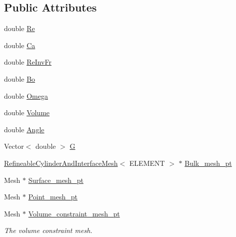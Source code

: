 \subsection*{Public Attributes}
\begin{DoxyCompactItemize}
\item 
double \hyperlink{classRefineableRotatingCylinderProblem_a3a7fe3dd801eb1ef71dcf8e4c6a237ef}{Re}
\item 
double \hyperlink{classRefineableRotatingCylinderProblem_a2e47341fa1a71da29907ead94aeb5ec2}{Ca}
\item 
double \hyperlink{classRefineableRotatingCylinderProblem_acf70c93c4b4db46c1809f6b9f68214ee}{Re\+Inv\+Fr}
\item 
double \hyperlink{classRefineableRotatingCylinderProblem_a253a0d7954a3527bf1410f01080e5c70}{Bo}
\item 
double \hyperlink{classRefineableRotatingCylinderProblem_aaf1d39e57b4fc4d470b69f01121d93a3}{Omega}
\item 
double \hyperlink{classRefineableRotatingCylinderProblem_aa476013effb3f9a45cf1e1e2198aad14}{Volume}
\item 
double \hyperlink{classRefineableRotatingCylinderProblem_a54c8bf3a55597f50087c82ed5f955f5b}{Angle}
\item 
Vector$<$ double $>$ \hyperlink{classRefineableRotatingCylinderProblem_a270f2243978a54c8d787cc912168bb90}{G}
\item 
\hyperlink{classRefineableCylinderAndInterfaceMesh}{Refineable\+Cylinder\+And\+Interface\+Mesh}$<$ E\+L\+E\+M\+E\+NT $>$ $\ast$ \hyperlink{classRefineableRotatingCylinderProblem_aeb99a895bfdcceea6d13b41df7a59545}{Bulk\+\_\+mesh\+\_\+pt}
\item 
Mesh $\ast$ \hyperlink{classRefineableRotatingCylinderProblem_a48cc95921f8a03c220609d9666bcf406}{Surface\+\_\+mesh\+\_\+pt}
\item 
Mesh $\ast$ \hyperlink{classRefineableRotatingCylinderProblem_af438026e310576c522706dbff92ee750}{Point\+\_\+mesh\+\_\+pt}
\item 
Mesh $\ast$ \hyperlink{classRefineableRotatingCylinderProblem_a3bb79346179cb5ef1dad280530ea24e8}{Volume\+\_\+constraint\+\_\+mesh\+\_\+pt}
\begin{DoxyCompactList}\small\item\em The volume constraint mesh. \end{DoxyCompactList}\end{DoxyCompactItemize}
